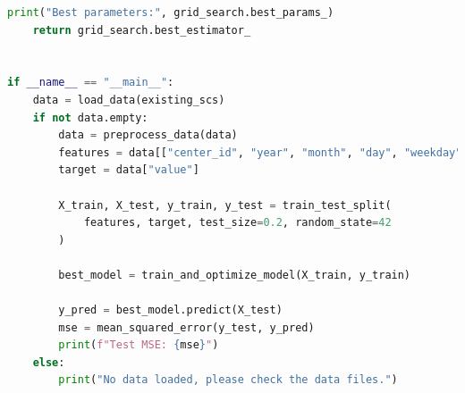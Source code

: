 \documentclass[UTF8]{article}%
\begin{document}
\begin{lstlisting}[language=python]
    print("Best parameters:", grid_search.best_params_)
    return grid_search.best_estimator_


if __name__ == "__main__":
    data = load_data(existing_scs)
    if not data.empty:
        data = preprocess_data(data)
        features = data[["center_id", "year", "month", "day", "weekday"]]
        target = data["value"]

        X_train, X_test, y_train, y_test = train_test_split(
            features, target, test_size=0.2, random_state=42
        )

        best_model = train_and_optimize_model(X_train, y_train)

        y_pred = best_model.predict(X_test)
        mse = mean_squared_error(y_test, y_pred)
        print(f"Test MSE: {mse}")
    else:
        print("No data loaded, please check the data files.")
\end{lstlisting}
\end{document}

